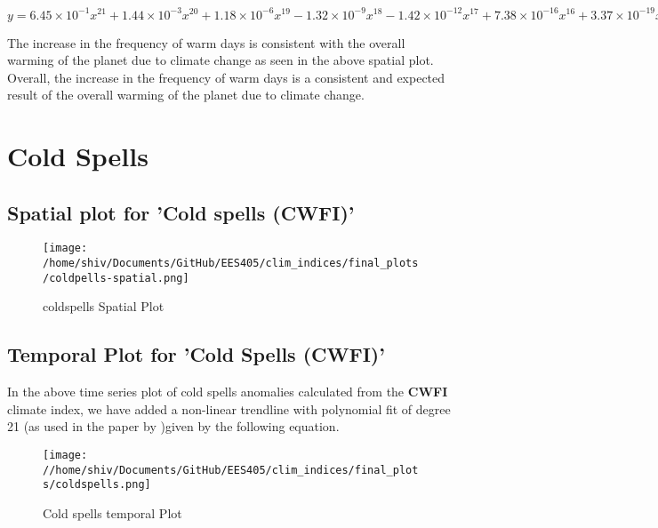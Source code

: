 \documentclass[a4paper, 12pt, twoside]{report}
\begin{document}
$ y = 6.45 \times 10^{-1}x^{21} + 1.44 \times 10^{-3}x^{20} + 1.18 \times 10^{-6}x^{19} - 1.32 \times 10^{-9}x^{18} - 1.42 \times 10^{-12}x^{17} + 7.38 \times 10^{-16}x^{16} + 3.37 \times 10^{-19}x^{15} - 2.23 \times 10^{-22}x^{14} + 4.12 \times 10^{-28}x^{13} + 2.42 \times 10^{-29}x^{12} - 6.06 \times 10^{-33}x^{11} + 6.37 \times 10^{-39}x^{10} + 3.00 \times 10^{-40}x^{9} - 7.88 \times 10^{-44}x^{8} + 1.15 \times 10^{-47}x^{7} - 1.11 \times 10^{-51}x^{6} + 7.58 \times 10^{-56}x^{5} - 3.66 \times 10^{-60}x^{4} + 1.23 \times 10^{-64}x^{3} - 2.76 \times 10^{-69}x^{2} + 3.72 \times 10^{-74}x^{1} - 2.27 \times 10^{-79}$

The increase in the frequency of warm days is consistent with the overall warming of the planet due to climate change as seen in the above spatial plot.\\
Overall, the increase in the frequency of warm days is a consistent and expected result of the overall warming of the planet due to climate change.

\section{Cold Spells}
\subsection{Spatial plot for 'Cold spells (CWFI)'}

\begin{figure}[htb]
    \centering
    \texttt{[image: /home/shiv/Documents/GitHub/EES405/clim\_indices/final\_plots/coldpells-spatial.png]}
    \caption{coldspells Spatial Plot}
    \label{fig:coldwave_spatial}
\end{figure}

\subsection{Temporal Plot for 'Cold Spells (CWFI)'}
In the above time series plot of cold spells anomalies calculated from the \textbf{CWFI} climate index, we have added a non-linear trendline with polynomial fit of degree 21 (as used in the paper by )given by the following equation. \\
\begin{figure}[htb]
    \centering
    \texttt{[image: //home/shiv/Documents/GitHub/EES405/clim\_indices/final\_plots/coldspells.png]}
    \caption{Cold spells temporal Plot}
    \label{fig:coldspells_temporal}
\end{figure}
\end{document}
